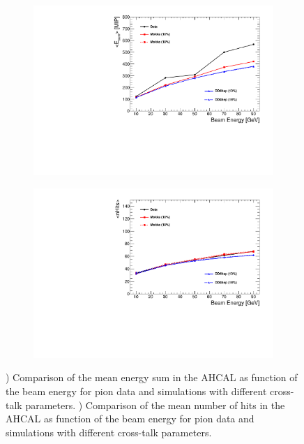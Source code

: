 \begin{figure}[htbp!]
  \centering
  \begin{subfigure}[t]{0.49\textwidth}
    \includegraphics[width=1.\linewidth]{chap5/fig_AHCAL_Timing/Pions/EsumPions_BeamEnergy.pdf}
    \caption{} \label{fig:EsumMean}
  \end{subfigure}
  \hfill
  \begin{subfigure}[t]{0.49\textwidth}
    \includegraphics[width=1.\linewidth]{chap5/fig_AHCAL_Timing/Pions/nHitsPions_BeamEnergy.pdf}
    \caption{} \label{fig:nHitsMean}
  \end{subfigure}
  \caption{) Comparison of the mean energy sum in the AHCAL as function of the beam energy for pion data and simulations with different cross-talk parameters. ) Comparison of the mean number of hits in the AHCAL as function of the beam energy for pion data and simulations with different cross-talk parameters.}
  \label{fig:piVal}
\end{figure}
